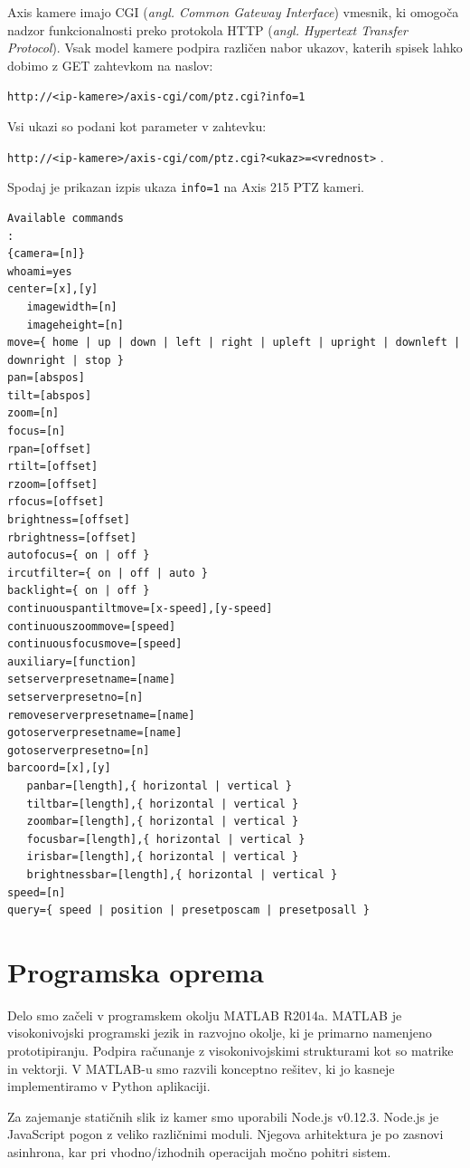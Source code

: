 \documentclass[a4paper, 12pt]{book}
\begin{document}
Axis kamere imajo CGI (\emph{angl. Common Gateway Interface}) vmesnik, ki omogoča nadzor funkcionalnosti preko protokola HTTP (\emph{angl. Hypertext Transfer Protocol}). Vsak model kamere podpira različen nabor ukazov, katerih spisek lahko dobimo z GET zahtevkom na naslov:
\begin{center}
\texttt{http://<ip-kamere>/axis-cgi/com/ptz.cgi?info=1}
\end{center}
Vsi ukazi so podani kot parameter v zahtevku:
\begin{center}
\texttt{http://<ip-kamere>/axis-cgi/com/ptz.cgi?<ukaz>=<vrednost>} .
\end{center}
Spodaj je prikazan izpis ukaza \texttt{info=1} na Axis 215 PTZ kameri.
\begin{lstlisting}
Available commands
:
{camera=[n]}
whoami=yes
center=[x],[y]
   imagewidth=[n]
   imageheight=[n]
move={ home | up | down | left | right | upleft | upright | downleft | downright | stop }
pan=[abspos]
tilt=[abspos]
zoom=[n]
focus=[n]
rpan=[offset]
rtilt=[offset]
rzoom=[offset]
rfocus=[offset]
brightness=[offset]
rbrightness=[offset]
autofocus={ on | off }
ircutfilter={ on | off | auto }
backlight={ on | off }
continuouspantiltmove=[x-speed],[y-speed]
continuouszoommove=[speed]
continuousfocusmove=[speed]
auxiliary=[function]
setserverpresetname=[name]
setserverpresetno=[n]
removeserverpresetname=[name]
gotoserverpresetname=[name]
gotoserverpresetno=[n]
barcoord=[x],[y]
   panbar=[length],{ horizontal | vertical }
   tiltbar=[length],{ horizontal | vertical }
   zoombar=[length],{ horizontal | vertical }
   focusbar=[length],{ horizontal | vertical }
   irisbar=[length],{ horizontal | vertical }
   brightnessbar=[length],{ horizontal | vertical }
speed=[n]
query={ speed | position | presetposcam | presetposall }
\end{lstlisting}


\section{Programska oprema}
Delo smo začeli v programskem okolju MATLAB R2014a. MATLAB je visokonivojski programski jezik in razvojno okolje, ki je primarno namenjeno prototipiranju. Podpira računanje z visokonivojskimi strukturami kot so matrike in vektorji. V MATLAB-u smo razvili konceptno rešitev, ki jo kasneje implementiramo v Python aplikaciji. 

Za zajemanje statičnih slik iz kamer smo uporabili Node.js v0.12.3. Node.js je JavaScript pogon z veliko različnimi moduli. Njegova arhitektura je po zasnovi asinhrona, kar pri vhodno/izhodnih operacijah močno pohitri sistem.
\end{document}
